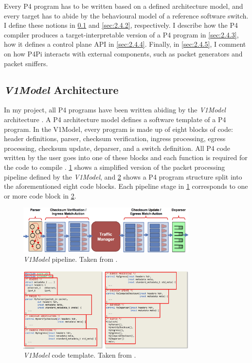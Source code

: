 Every P4 program has to be written based on a defined architecture model, and every target has to abide by the behavioural model of a reference software switch. I define these notions in \cref{sec:2.4.1} and \cref{sec:2.4.2}, respectively. I describe how the P4 compiler produces a target-interpretable version of a P4 program in \cref{sec:2.4.3}, how it defines a control plane API in \cref{sec:2.4.4}. Finally, in \cref{sec:2.4.5}, I comment on how P4Pi interacts with external components, such as packet generators and packet sniffers.



\subsection{\textit{V1Model} Architecture}
\label{sec:2.4.1}

In my project, all P4 programs have been written abiding by the \textit{V1Model} architecture \cite{V1model}. A P4 architecture model defines a software template of a P4 program. In the V1Model, every program is made up of eight blocks of code: header definitions, parser, checksum verification, ingress processing, egress processing, checksum update, deparser, and a switch definition. All P4 code written by the user goes into one of these blocks and each function is required for the code to compile \cite{V1model}. \cref{fig:prep-v1arch} shows a simplified version of the packet processing pipeline defined by the \textit{V1Model}, and \cref{fig:prep-v1code} shows a P4 program structure split into the aforementioned eight code blocks. Each pipeline stage in \cref{fig:prep-v1arch} corresponds to one or more code block in \cref{fig:prep-v1code}.

\begin{figure}[htbp]
  \centering
    \includegraphics[width=0.8\textwidth]{figures/preparation/v1model_architecture.png}
     \caption{\textit{V1Model} pipeline. Taken from \cite{P4LangTutorial}.}
     \label{fig:prep-v1arch}
\end{figure}

\begin{figure}[htbp]
  \centering
    \includegraphics[width=0.8\textwidth]{figures/preparation/v1model_template.jpg}
     \caption{\textit{V1Model} code template. Taken from \cite{P4LangTutorial}.}
     \label{fig:prep-v1code}
\end{figure}



